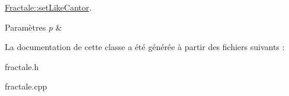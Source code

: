 \hyperlink{class_fractale_a14d1e1b757de8d3cbfb227d50c2dbd4c}{Fractale\+::set\+Like\+Cantor}. 


\begin{DoxyParams}{Paramètres}
{\em p} & \\
\hline
\end{DoxyParams}


La documentation de cette classe a été générée à partir des fichiers suivants \+:\begin{DoxyCompactItemize}
\item 
fractale.\+h\item 
fractale.\+cpp\end{DoxyCompactItemize}
